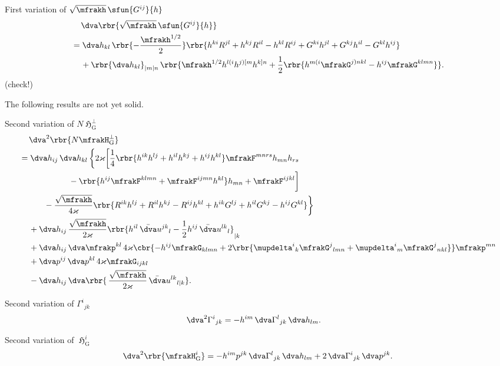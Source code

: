 \documentclass[a4paper,11pt]{article}
\begin{document}
First variation of $\sqrt{\mfrakh}\,\sfun{G^{ij}}{h}$
\begin{align}
&\quad\,
\dva\rbr{\sqrt{\mfrakh}\,\sfun{G^{ij}}{h}}
\nonumber \\
&=\dva h_{kl}\,\rbr{-\frac{\mfrakh^{1/2}}{2}}
\rbr{h^{ki}R^{jl}+h^{kj}R^{il}-h^{kl}R^{ij}
+G^{ki}h^{jl}+G^{kj}h^{il}-G^{kl}h^{ij}}
\nonumber \\
&\quad\,
+\rbr{\dva h_{kl}}_{|m|n}\,
\rbr{\mfrakh^{1/2}h^{l(i}h^{j)[m}h^{k]n} + \frac{1}{2}\rbr{
h^{m(i}\mfrakG^{j)nkl} - h^{ij}\mfrakG^{klmn}}}.
\end{align}
(check!)

The following results are not yet solid.

Second variation of $N \mfrakH_\text{G}^\perp$
\begin{align}
&\quad\,
\dva^2\rbr{N \mfrakH_\text{G}^\perp}
\nonumber \\
&= \dva h_{ij}\,\dva h_{kl}\,\bigg\{ 2\varkappa\bigg[
\frac{1}{4}\rbr{h^{ik}h^{lj}+h^{il}h^{kj}+h^{ij}h^{kl}} \mfrakF^{mnrs} 
h_{mn} h_{rs}
\nonumber \\
&\qquad\qquad\qquad
-\rbr{h^{ij}\mfrakF^{klmn}+\mfrakF^{ijmn}h^{kl}}h_{mn}
+\mfrakF^{ijkl} \bigg]
\nonumber \\
&\qquad\quad
-\frac{\sqrt{\mfrakh}}{4\varkappa}\rbr{
R^{ik}h^{lj}+R^{il}h^{kj}-R^{ij}h^{kl}+h^{ik}G^{lj}+h^{il}G^{kj}-h^{ij}G^{kl}}
\bigg\}
\nonumber \\
&\quad\,
+\dva h_{ij}\,\frac{\sqrt{\mfrakh}}{2\varkappa}
\rbr{h^{il}\,\bar{\dva}u^{jk}{}_{l}
- \frac{1}{2}h^{ij}\,\bar{\dva}u^{lk}{}_{l}}_{|k} 
\nonumber \\
&\quad\,
+\dva h_{ij}\,\dva \mfrakp^{kl}\,4\varkappa
\cbr{-h^{ij}\mfrakG_{klmn}+2\rbr{\mupdelta^i{}_k\mfrakG^{j}{}_{lmn} 
+\mupdelta^i{}_m\mfrakG^{j}{}_{nkl}} } \mfrakp^{mn}
\nonumber \\
&\quad\,
+\dva p^{ij}\,\dva p^{kl}\,4\varkappa \mfrakG_{ijkl}
\nonumber \\
&\quad\,
-\dva h_{ij}\,
\dva\rbr{\,\frac{\sqrt{\mfrakh}}{2\varkappa}\,\bar{\dva}u^{lk}{}_{l|k}}.
\end{align}

Second variation of $\Gamma^i{}_{jk}$
\begin{align}
\dva^2 \Gamma^i{}_{jk} &=
- h^{im} \,\dva\Gamma^{l}{}_{jk} \,\dva h_{lm}.
\end{align}

Second variation of $\mfrakH_\text{G}^i$
\begin{align}
\dva^2\rbr{\mfrakH_\text{G}^i} = -h^{im}p^{jk}
\,\dva\Gamma^{l}{}_{jk}\,\dva h_{lm} + 2\,\dva\Gamma^{i}{}_{jk}\,\dva p^{jk}.
\end{align}
\end{document}
